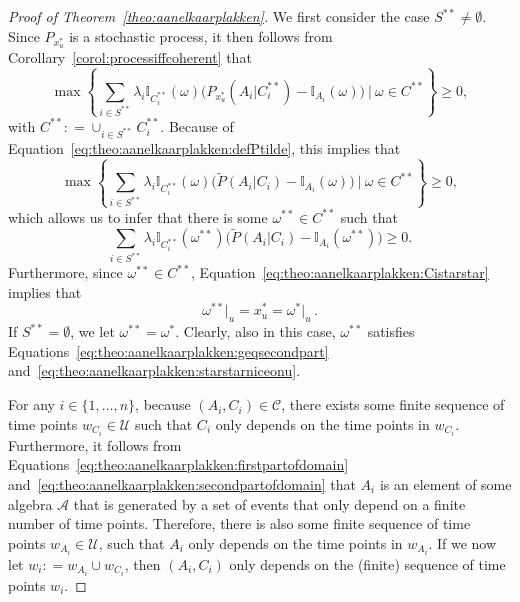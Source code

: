 \documentclass[10pt,a4paper]{paper}
\theoremstyle{definition}
\newcommand{\ind}[1]{\mathbb{I}_{#1}}
\newcommand{\coloneqq}{:\!=}
\begin{document}
\begin{proof}[Proof of Theorem~\ref{theo:aanelkaarplakken}]
We first consider the case $S^{**}\neq\emptyset$. Since $P_{x_u^*}$ is a stochastic process, it then follows from Corollary~\ref{corol:processiffcoherent} that
\begin{equation*}%
\max\left\{\sum_{i\in S^{**}}\lambda_i\ind{C_i^{**}}(\omega)\bigl(P_{x_u^*}(A_i\vert C_i^{**})-\ind{A_i}(\omega)\bigr)~\Bigg\vert~\omega\in C^{**}\right\}\geq0,
\end{equation*}
with $C^{**}\coloneqq\cup_{i\in S^{**}}C_i^{**}$. Because of Equation~\eqref{eq:theo:aanelkaarplakken:defPtilde}, this implies that
\begin{equation*}%
\max\left\{\sum_{i\in S^{**}}\lambda_i\ind{C_i^{**}}(\omega)\bigl(\tilde{P}(A_i\vert C_i)-\ind{A_i}(\omega)\bigr)~\Bigg\vert~\omega\in C^{**}\right\}\geq0,
\end{equation*}
which allows us to infer that there is some $\omega^{**}\in C^{**}$ such that
\begin{equation}\label{eq:theo:aanelkaarplakken:geqsecondpart}
\sum_{i\in S^{**}}\lambda_i\ind{C_i^{**}}(\omega^{**})\bigl(\tilde{P}(A_i\vert C_i)-\ind{A_i}(\omega^{**})\bigr)\geq0.
\end{equation}
Furthermore, since $\omega^{**}\in C^{**}$, Equation~\eqref{eq:theo:aanelkaarplakken:Cistarstar} implies that
\begin{equation}\label{eq:theo:aanelkaarplakken:starstarniceonu}
\omega^{**}\vert_u=x_u^* = \omega^{*}\vert_u\,.
\end{equation}
If $S^{**}=\emptyset$, we let $\omega^{**}=\omega^{*}$. Clearly, also in this case, $\omega^{**}$ satisfies Equations~\eqref{eq:theo:aanelkaarplakken:geqsecondpart} and~\eqref{eq:theo:aanelkaarplakken:starstarniceonu}.

For any $i\in\{1,\ldots,n\}$, because $(A_i,C_i)\in\mathcal{C}$, there exists some finite sequence of time points $w_{C_i}\in\mathcal{U}$ such that $C_i$ only depends on the time points in $w_{C_i}$. Furthermore, it follows from Equations~\eqref{eq:theo:aanelkaarplakken:firstpartofdomain} and~\eqref{eq:theo:aanelkaarplakken:secondpartofdomain} that $A_i$ is an element of some algebra $\mathcal{A}$ that is generated by a set of events that only depend on a finite number of time points. Therefore, there is also some finite sequence of time points $w_{A_i}\in\mathcal{U}$, such that $A_i$ only depends on the time points in $w_{A_i}$. If we now let $w_i\coloneqq w_{A_i}\cup w_{C_i}$, then $(A_i,C_i)$ only depends on the (finite) sequence of time points $w_i$.


\end{proof}
\end{document}
